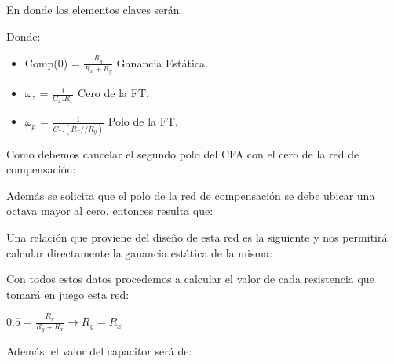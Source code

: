     En donde los elementos claves serán:

    \begin{center}
    \end{center}

    Donde:

    \begin{itemize}
        \item Comp(0) = $\frac{R_y}{R_x + R_y}$ Ganancia Estática.
        \item $\omega_z$ = $\frac{1}{C_x.R_x}$ Cero de la FT.
        \item $\omega_p$ = $\frac{1}{C_x.(R_x//R_y)}$ Polo de la FT.
    \end{itemize}

    Como debemos cancelar el segundo polo del CFA con el cero de la red de compensación:

    \begin{center}
    \end{center}

    Además se solicita que el polo de la red de compensación se debe ubicar una octava mayor al cero, entonces resulta que:

    \begin{center}
    \end{center}

    Una relación que proviene del diseño de esta red es la siguiente y nos permitirá calcular directamente la ganancia estática de la misma:

    \begin{center}
    \end{center}

    Con todos estos datos procedemos a calcular el valor de cada resistencia que tomará en juego esta red:

    \begin{center}
        $0.5 = \frac{R_y}{R_y + R_x} \xrightarrow{} R_y = R_x$
    \end{center}

    \begin{center}
    \end{center}

    Además, el valor del capacitor será de:


